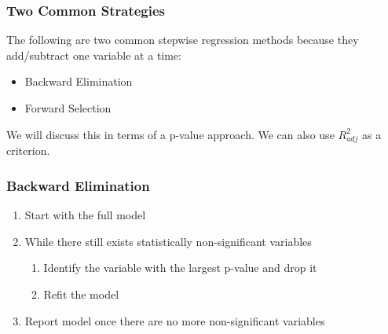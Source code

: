 \documentclass[handout]{beamer}
\newcommand{\blue}[1]{\textcolor{blue2}{#1}}
\begin{document}
\begin{frame}[fragile]
\frametitle{Two Common Strategies}

The following are two common \blue{stepwise regression} methods because they add/subtract one variable at a time:
\begin{itemize}
\item Backward Elimination
\item Forward Selection
\end{itemize}

\pause
\vspace{0.5cm}

We will discuss this in terms of a p-value approach.  We can also use $R^2_{adj}$ as a criterion.  

\end{frame}


\begin{frame}[fragile]
\frametitle{Backward Elimination}

\begin{enumerate}
\item Start with the \blue{full model}
\pause\item While there still exists statistically non-significant variables
\begin{enumerate}
\item Identify the variable with the largest p-value and drop it
\item Refit the model
\end{enumerate}
\pause\item Report model once there are no more non-significant variables
\end{enumerate}

\end{frame}
\end{document}
